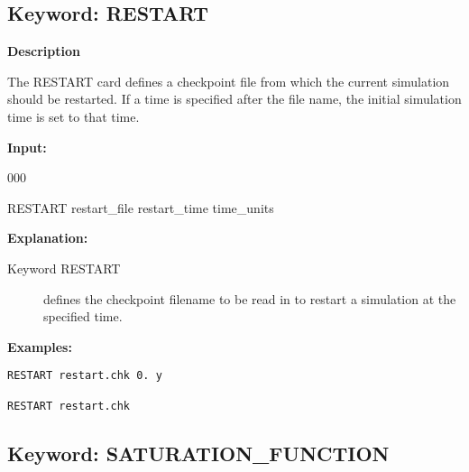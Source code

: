 \documentclass[12pt]{article}
\begin{document}

\newpage
\protect\hypertarget{target_restart}{}

\subsection{Keyword: RESTART}
{\noindent\bf Description}

The RESTART card defines a checkpoint file from which the current simulation should be restarted.  If a time is specified after the file name, the initial simulation time is set to that time.

{\noindent\bf Input:}

\begin{deflist}{000}
\item[RESTART] restart\_file restart\_time time\_units
\end{deflist}

{\noindent\bf Explanation:}
\begin{description}
\item[Keyword RESTART] defines the checkpoint filename to be read in to restart a simulation at the specified time.
\end{description}

{\noindent\bf
Examples:}

\begin{verbatim}
RESTART restart.chk 0. y

RESTART restart.chk 

\end{verbatim}


\newpage
\protect\hypertarget{target_sat}{}

\subsection{Keyword: SATURATION\_FUNCTION}

\end{document}
